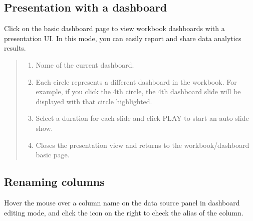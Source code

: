 \documentclass[letterpaper,10pt,english]{sphinxmanual}
\begin{document}
\subsection{Presentation with a dashboard}
\label{\detokenize{discovery/part04/present_the_dashboard:id1}}\label{\detokenize{discovery/part04/present_the_dashboard::doc}}
Click  on the basic dashboard page to view workbook dashboards with a presentation UI. In this mode, you can easily report and share data analytics results.
\begin{quote}

\begin{figure}[H]
\centering

\noindent{}
\end{figure}
\begin{enumerate}
\def\theenumi{\arabic{enumi}}
\def\labelenumi{\theenumi .}
\makeatletter\def\p@enumii{\p@enumi \theenumi .}\makeatother
\item {} 
 Name of the current dashboard.

\item {} 
 Each circle represents a different dashboard in the workbook. For example, if you click the 4th circle, the 4th dashboard slide will be displayed with that circle highlighted.

\item {} 
 Select a duration for each slide and click PLAY to start an auto slide show.

\item {} 
 Closes the presentation view and returns to the workbook/dashboard basic page.

\end{enumerate}
\end{quote}


\subsection{Renaming columns}
\label{\detokenize{discovery/part04/give_new_column_name(alias):id1}}\label{\detokenize{discovery/part04/give_new_column_name(alias)::doc}}
Hover the mouse over a column name on the data source panel in dashboard editing mode, and click the icon on the right to check the alias of the column.
\begin{quote}

\begin{figure}[H]
\centering

\noindent{}
\end{figure}
\end{quote}
\end{document}
